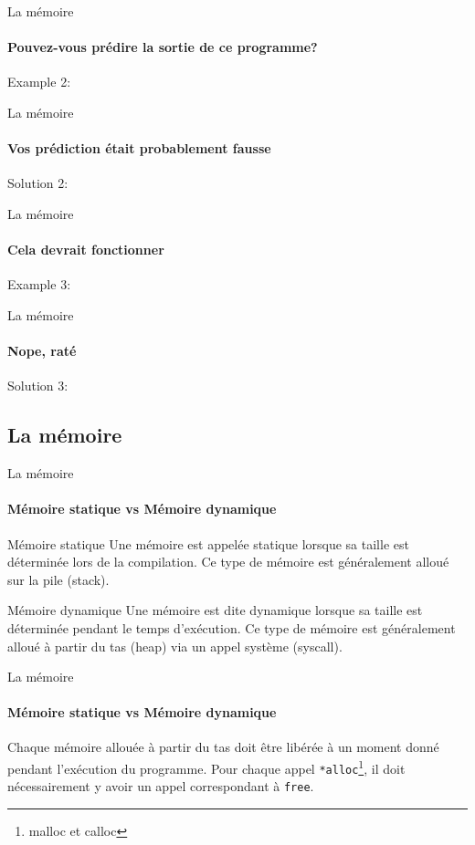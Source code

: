 \documentclass{beamer}
\begin{document}
\begin{darkframes}
  	\begin{frame}{La mémoire}
  		\framesubtitle{Pouvez-vous prédire la sortie de ce programme?}
  		Example 2:
  		\dataDemoTwo
  	\end{frame}
  	\begin{frame}{La mémoire}
  		\framesubtitle{Vos prédiction était probablement fausse}
  		Solution 2:
  		\dataDemoTwoSolution
  	\end{frame}
  
  	\begin{frame}{La mémoire}
  		\framesubtitle{Cela devrait fonctionner}
  		Example 3:
  		\dataDemoThree
  	\end{frame}
  	
  	\begin{frame}{La mémoire}
  		\framesubtitle{Nope, raté}
  		Solution 3:
  		\dataDemoThreeSolution
  	\end{frame}
   	
  	\subsection{La mémoire}
  	\begin{frame}{La mémoire}
  		\framesubtitle{Mémoire statique vs Mémoire dynamique}
  		\begin{block}{Mémoire statique}
  			Une mémoire est appelée \alert{statique } lorsque sa taille est déterminée lors de la \alert{compilation}. Ce type de mémoire est généralement alloué sur la \alert{pile} (stack).
  		\end{block}
  		\begin{block}{Mémoire dynamique}
  			Une mémoire est dite \alert{dynamique} lorsque sa taille est déterminée pendant le temps \alert{d'exécution}. Ce type de mémoire est généralement alloué à partir du \alert{tas} (heap) via un appel système (syscall).
  		\end{block}
  	\end{frame} 	
  
  	\begin{frame}{La mémoire}
  		\framesubtitle{Mémoire statique vs Mémoire dynamique}
  		\begin{alertblock}{
  			Chaque mémoire allouée à partir du tas doit être libérée à un moment donné pendant l'exécution du programme. Pour chaque appel \texttt{*alloc}\footnote[frame]{malloc et calloc}, il doit nécessairement y avoir un appel correspondant à \texttt{free}.}
  		\end{alertblock}
  	\end{frame}
  

\end{darkframes}
\end{document}
